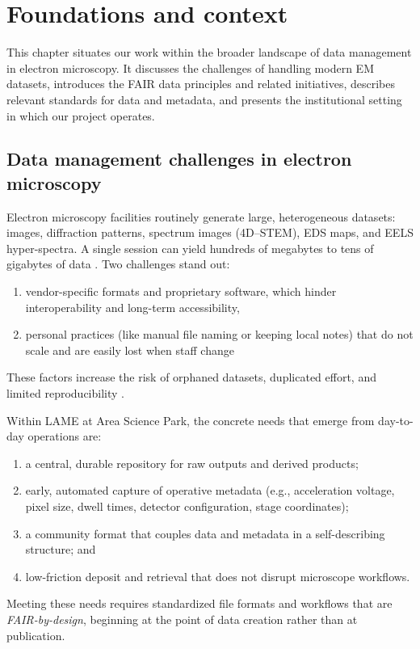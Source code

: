 \chapter{Foundations and context}
\label{chap:foundations}

This chapter situates our work within the broader landscape of data management in electron microscopy. 
It discusses the challenges of handling modern EM datasets, introduces the FAIR data principles and related initiatives, describes relevant standards for data and metadata, and presents the institutional setting in which our project operates.

\section{Data management challenges in electron microscopy}

Electron microscopy facilities routinely generate large, heterogeneous datasets: images, diffraction patterns, spectrum images (4D--STEM), EDS maps, and EELS hyper-spectra. 
A single session can yield hundreds of megabytes to tens of gigabytes of data \parencite{Poger2023BigDataEM}. 
Two challenges stand out: 

\begin{enumerate}
	\item vendor-specific formats and proprietary software, which hinder interoperability and long-term accessibility,
	\item personal practices (like manual file naming or keeping local notes) that do not scale and are easily lost when staff change \parencite{Moore2021OMENGFF,Korir2024TenRecs}
\end{enumerate}

These factors increase the risk of orphaned datasets, duplicated effort, and limited reproducibility \parencite{Poger2023BigDataEM,Korir2024TenRecs}.

Within LAME at Area Science Park, the concrete needs that emerge from day-to-day operations are:
\begin{enumerate}[label=(\alph*)]
	\item a central, durable repository for raw outputs and derived products;
	\item early, automated capture of operative metadata (e.g., acceleration voltage, pixel size, dwell times, detector configuration, stage coordinates);
	\item a community format that couples data and metadata in a self-describing structure; and
	\item low-friction deposit and retrieval that does not disrupt microscope workflows.
\end{enumerate}
Meeting these needs requires standardized file formats and workflows that are \emph{FAIR-by-design}, beginning at the point of data creation rather than at publication.

